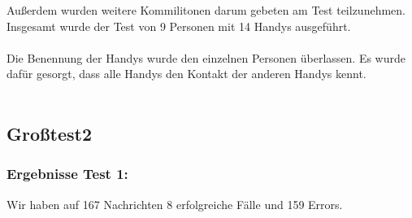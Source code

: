 Außerdem wurden weitere Kommilitonen darum gebeten am Test teilzunehmen.
Insgesamt wurde der Test von 9 Personen mit 14 Handys ausgeführt.\\\\

Die Benennung der Handys wurde den einzelnen Personen überlassen. Es
wurde dafür gesorgt, dass alle Handys den Kontakt der anderen Handys
kennt.\\\\

\clearpage\subsection{Großtest2}\label{grosstest-2}
\subsubsection{Ergebnisse Test 1:}\label{ergebnisse-test-1-1}

Wir haben auf 167 Nachrichten 8 erfolgreiche Fälle und 159 Errors.

